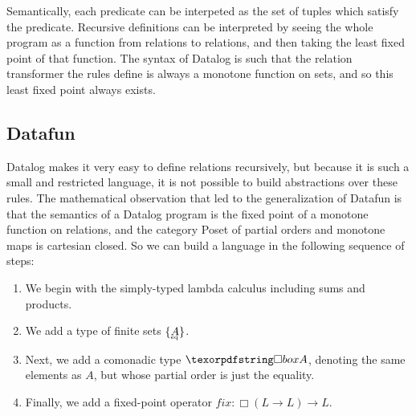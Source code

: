 Semantically, each predicate can be interpeted as the set of tuples
which satisfy the predicate. Recursive definitions can be interpreted
by seeing the whole program as a function from relations to relations,
and then taking the least fixed point of that function. The syntax of
Datalog is such that the relation transformer the rules define is
always a monotone function on sets, and so this least fixed point
always exists.

\subsection{Datafun}

Datalog makes it very easy to define relations recursively, but
because it is such a small and restricted language, it is not possible
to build abstractions over these rules.  The mathematical observation
that led to the generalization of Datafun is that the semantics of a
Datalog program is the fixed point of a monotone function on
relations, and the category Poset of partial orders and monotone maps
is cartesian closed. So we can build a language in the following
sequence of steps:

\begin{enumerate}
\item We begin with the simply-typed lambda calculus including sums
  and products.
\item We add a type of finite sets $\tset{\eqt A}$.
\item Next, we add a comonadic type $\iso A$, denoting the same elements
  as $A$, but whose partial order is just the equality.
\item Finally, we add a fixed-point operator $\mathit{fix} : \Box(L \to L) \to L$. 
\end{enumerate}






